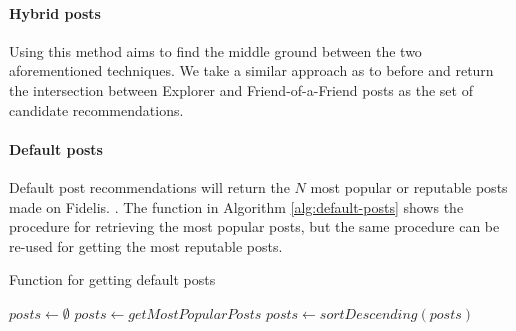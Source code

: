 \paragraph{Hybrid posts} Using this method aims to find the middle ground between the two aforementioned techniques. We take a similar approach as to before and return the intersection between Explorer and Friend-of-a-Friend posts as the set of candidate recommendations.

\paragraph{Default posts} Default post recommendations will return the $N$ most popular or reputable posts made on Fidelis. . The function in Algorithm \ref{alg:default-posts} shows the procedure for retrieving the most popular posts, but the same procedure can be re-used for getting the most reputable posts.

\begin{algorithm}[H]
\caption{Function for getting default posts}
\label{alg:default-posts}
\begin{algorithmic}[1]
	\State $posts\gets \emptyset$
	\State $posts\gets getMostPopularPosts$
	\State $posts\gets sortDescending(posts)$
	\State {}
\EndFunction
\end{algorithmic}
\end{algorithm}